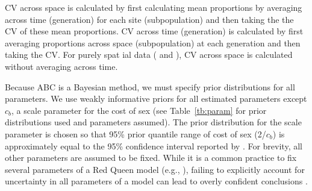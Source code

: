 \documentclass{article}\usepackage[]{graphicx}\usepackage[]{color}
\begin{document}
CV across space is calculated by first calculating mean proportions by averaging across time (generation) for each site (subpopulation) and then taking the the CV of these mean proportions.
CV across time (generation) is calculated by first averaging proportions across space (subpopulation) at each generation and then taking the CV.
For purely spat ial data (\cite{dagan2013clonal} and \cite{mckone2016fine}), CV across space is calculated without averaging across time.

Because ABC is a Bayesian method, we must specify prior distributions for all parameters.
We use weakly informative priors for all estimated parameters except $c_b$, a scale parameter for the cost of sex (see Table~\ref{tb:param} for prior distributions used and parameters assumed).
The prior distribution for the scale parameter is chosen so that 95\% prior quantile range of cost of sex (2/$c_b$) is approximately equal to the 95\% confidence interval reported by \cite{gibson2017two}.
For brevity, all other parameters are assumed to be fixed.
While it is a common practice to fix several parameters of a Red Queen model (e.g., \cite{lively2010epidemiological,ashby2015diversity,haafke2016eco,ashby2019understanding}), failing to explicitly account for uncertainty in all parameters of a model can lead to overly confident conclusions \citep{elderd2006uncertainty}.
\end{document}
